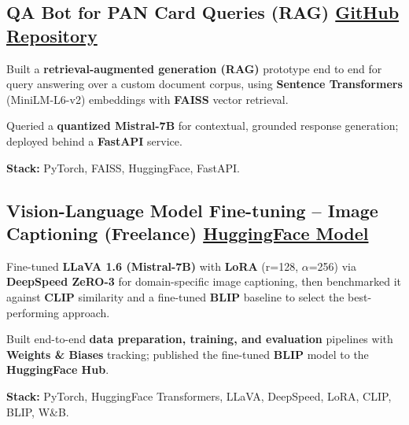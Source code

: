 \documentclass[letter,10pt]{article}
\begin{document}
\subsection{QA Bot for PAN Card Queries (RAG) \hfill \href{https://github.com/sunil448832/Natural-Language-Processing/tree/master/RAG(Retrieval\%20Augment\%20Generation)}{GitHub Repository}}
\begin{zitemize}
\item Built a \textbf{retrieval-augmented generation (RAG)} prototype end to end for query answering over a custom document corpus, using \textbf{Sentence Transformers} (MiniLM-L6-v2) embeddings with \textbf{FAISS} vector retrieval.
\item Queried a \textbf{quantized Mistral-7B} for contextual, grounded response generation; deployed behind a \textbf{FastAPI} service.
\item \textbf{Stack:} PyTorch, FAISS, HuggingFace, FastAPI.
\end{zitemize}

\subsection{Vision-Language Model Fine-tuning – Image Captioning (Freelance) \hfill \href{https://huggingface.co/sunil448832/blip-model}{HuggingFace Model}}
\begin{zitemize}
\item Fine-tuned \textbf{LLaVA 1.6 (Mistral-7B)} with \textbf{LoRA} (r=128, $\alpha$=256) via \textbf{DeepSpeed ZeRO-3} for domain-specific image captioning, then benchmarked it against \textbf{CLIP} similarity and a fine-tuned \textbf{BLIP} baseline to select the best-performing approach.
\item Built end-to-end \textbf{data preparation, training, and evaluation} pipelines with \textbf{Weights \& Biases} tracking; published the fine-tuned \textbf{BLIP} model to the \textbf{HuggingFace Hub}.
\item \textbf{Stack:} PyTorch, HuggingFace Transformers, LLaVA, DeepSpeed, LoRA, CLIP, BLIP, W\&B.
\end{zitemize}
\end{document}
